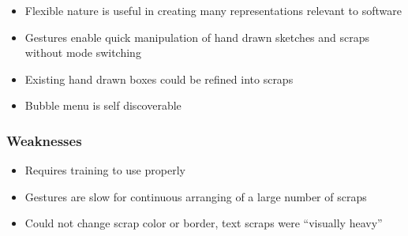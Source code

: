 \documentclass[12pt,fleqn]{ucithesis}
\begin{document}
\begin{itemize}
	\item Flexible nature is useful in creating many representations relevant to software
	\item Gestures enable quick manipulation of hand drawn sketches and scraps without mode switching
	\item Existing hand drawn boxes could be refined into scraps
	\item Bubble menu is self discoverable
\end{itemize}

\subsubsection{Weaknesses}
\begin{itemize}
	\item Requires training to use properly
	\item Gestures are slow for continuous arranging of a large number of scraps
	\item Could not change scrap color or border, text scraps were ``visually heavy''
\end{itemize}

%
%	
%
%
%
%
%
\end{document}
